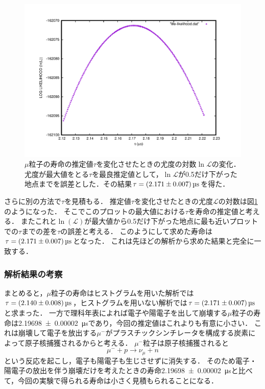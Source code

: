 \documentclass[a4paper,11pt]{jsarticle}
\begin{document}
\begin{figure}[htbp]
  \centering
  \includegraphics[width=13cm]{likelihood.pdf}
  \caption{$\mu$粒子の寿命の推定値$\tau$を変化させたときの尤度の対数$\ln{\mathcal{L}}$の変化．尤度が最大値をとる$\tau$を最良推定値として，$\ln{\mathcal{L}}$が0.5だけ下がった地点までを誤差とした．その結果$\tau=\SI[separate-uncertainty]{2.171\pm 0.007}{\us}$を得た．}
  \label{fig:likelihood}
\end{figure}

さらに別の方法で$\tau$を見積もる．
推定値$\tau$を変化させたときの尤度$\mathcal{L}$の対数は図\ref{fig:likelihood}のようになった．
そこでこのプロットの最大値における$\tau$を寿命の推定値と考える．
またこれと$\ln(\mathcal{L})$が最大値から0.5だけ下がった地点に最も近いプロットでの$\tau$までの差を$\tau$の誤差と考える．
このようにして求めた寿命は$\tau=\SI[separate-uncertainty]{2.171\pm 0.007}{\us}$となった．
これは先ほどの解析から求めた結果と完全に一致する．

\subsubsection{解析結果の考察}
まとめると，$\mu$粒子の寿命はヒストグラムを用いた解析では$\tau = \SI[separate-uncertainty]{2.140\pm 0.008}{\us}$，ヒストグラムを用いない解析では$\tau=\SI[separate-uncertainty]{2.171\pm 0.007}{\us}$と求まった．
一方で理科年表によれば電子や陽電子を出して崩壊する$\mu$粒子の寿命は\SI[separate-uncertainty]{2.19698\pm 0.00002}{\us}であり，今回の推定値はこれよりも有意に小さい．
これは崩壊して電子を放出する$\mu^{-}$がプラスチックシンチレータを構成する炭素によって原子核捕獲されるからと考える．
$\mu^{-}$粒子は原子核捕獲されると
\begin{equation}
  \mu^{-} + p \to \nu_{\mu} + n
\end{equation}
という反応を起こし，電子も陽電子も生じさせずに消失する．
そのため電子・陽電子の放出を伴う崩壊だけを考えたときの寿命\SI[separate-uncertainty]{2.19698\pm 0.00002}{\us}と比べて，今回の実験で得られる寿命は小さく見積もられることになる．
\end{document}
